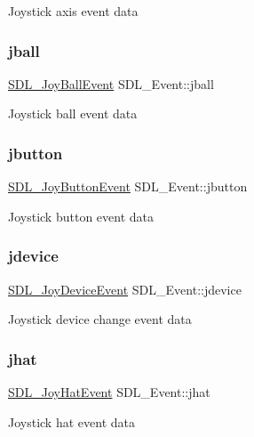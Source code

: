 Joystick axis event data \mbox{\label{union_s_d_l___event_ae433f511e3383d17f8fe02df745ee8f8}} 
\subsubsection{\texorpdfstring{jball}{jball}}
{\footnotesize\ttfamily \mbox{\hyperlink{struct_s_d_l___joy_ball_event}{S\+D\+L\+\_\+\+Joy\+Ball\+Event}} S\+D\+L\+\_\+\+Event\+::jball}

Joystick ball event data \mbox{\label{union_s_d_l___event_a591104d64903ae1cf70874fb5d3124ff}} 
\subsubsection{\texorpdfstring{jbutton}{jbutton}}
{\footnotesize\ttfamily \mbox{\hyperlink{struct_s_d_l___joy_button_event}{S\+D\+L\+\_\+\+Joy\+Button\+Event}} S\+D\+L\+\_\+\+Event\+::jbutton}

Joystick button event data \mbox{\label{union_s_d_l___event_a17514dc19a846ea1b5fbe44123700c4c}} 
\subsubsection{\texorpdfstring{jdevice}{jdevice}}
{\footnotesize\ttfamily \mbox{\hyperlink{struct_s_d_l___joy_device_event}{S\+D\+L\+\_\+\+Joy\+Device\+Event}} S\+D\+L\+\_\+\+Event\+::jdevice}

Joystick device change event data \mbox{\label{union_s_d_l___event_a421b40e0f8e01f181c8d5548cff1dd1d}} 
\subsubsection{\texorpdfstring{jhat}{jhat}}
{\footnotesize\ttfamily \mbox{\hyperlink{struct_s_d_l___joy_hat_event}{S\+D\+L\+\_\+\+Joy\+Hat\+Event}} S\+D\+L\+\_\+\+Event\+::jhat}

Joystick hat event data \mbox{\label{union_s_d_l___event_ab99927835cc77a9b6bb50b419b4a27df}} 
